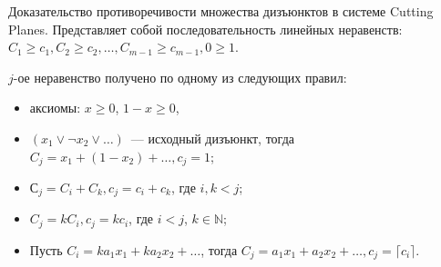 

\setcounter{curtask}{15}







\begin{definition*}
    Доказательство противоречивости множества дизъюнктов в системе Cutting Planes. Представляет собой
    последовательность линейных неравенств:
    $C_1 \ge c_1, C_2 \ge c_2, \dots, C_{m - 1} \ge c_{m - 1}, 0 \ge 1$.

    $j$-ое неравенство получено по одному из следующих правил:
    \begin{itemize}
        \item аксиомы: $x \ge 0$, $1 - x \ge 0$,
	    \item $(x_1 \lor \neg x_2 \lor \dots)$~--- исходный дизъюнкт, тогда
    		$C_j = x_1 + (1 - x_2) + \dots, c_j = 1$;
        \item $С_j = C_i + C_k, c_j = c_i + c_k$, где $i, k < j$;
		\item $C_j = k C_i, c_j = k c_i$, где $i < j$, $k \in \mathbb{N}$;
        \item Пусть $C_i = k a_1 x_1 + k a_2 x_2 + \dots$, тогда $C_j = a_1 x_1 +
    		a_2 x_2 + \dots, c_j =  \lceil c_i \rceil$.
    \end{itemize}
\end{definition*}






